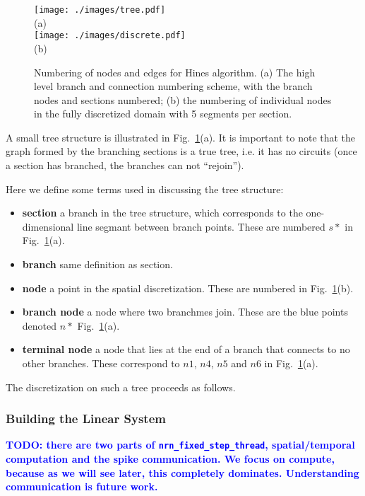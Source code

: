 \documentclass[11pt,a4paper]{article}
\newcommand{\todo}[1]{\textbf{\textcolor{Blue}{TODO: #1}}} %
\newcommand{\lst}[1]{\lstinline!#1!} %
\newcommand{\fig}[1]{Fig.~\ref{#1}} %
\begin{document}
\begin{figure}[htp!]
\centering
\texttt{[image: ./images/tree.pdf]}
\\{\normalsize (a)}\\
\texttt{[image: ./images/discrete.pdf]}
\\{\normalsize (b)}
\caption{Numbering of nodes and edges for Hines algorithm. (a) The high level branch and connection numbering scheme, with the branch nodes and sections numbered; (b) the numbering of individual nodes in the fully discretized domain with 5 segments per section.}
\label{fig:tree}
\end{figure}

A small tree structure is illustrated in \fig{fig:tree}(a). It is important to note that the graph formed by the branching sections is a true tree, i.e. it has no circuits (once a section has branched, the branches can not ``rejoin'').

Here we define some terms used in discussing the tree structure:
\begin{itemize}
        \item \textbf{section} a branch in the tree structure, which corresponds to the one-dimensional line segmant between branch points. These are numbered $s*$ in \fig{fig:tree}(a).
        \item \textbf{branch} same definition as section.
        \item \textbf{node} a point in the spatial discretization. These are numbered in \fig{fig:tree}(b).
        \item \textbf{branch node} a node where two branchmes join. These are the blue points denoted $n*$ \fig{fig:tree}(a).
        \item \textbf{terminal node} a node that lies at the end of a branch that connects to no other branches. These correspond to $n1$, $n4$, $n5$ and $n6$ in \fig{fig:tree}(a).
\end{itemize}

The discretization on such a tree proceeds as follows.

\subsubsection{Building the Linear System}
\todo{there are two parts of \lst{nrn_fixed_step_thread}, spatial/temporal computation and the spike communication. We focus on compute, because as we will see later, this completely dominates. Understanding communication is future work.}
\end{document}

